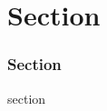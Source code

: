 
\section{Section} %


\iffalse
\begin{frame}
  \Huge{\centerline{Section}}
\end{frame}
\fi
\begin{frame}
  \frametitle{Section}
  \begin{block}{section}
  \end{block}
\end{frame}

